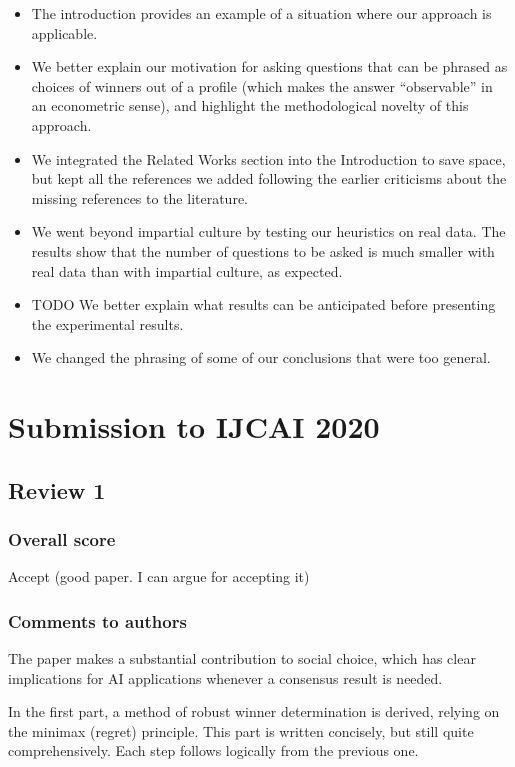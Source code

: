 \documentclass[version=3.21, pagesize, twoside=off, bibliography=totoc, DIV=calc, fontsize=12pt, a4paper]{scrartcl}
\begin{document}
\begin{itemize}
	\item The introduction provides an example of a situation where our approach is applicable.
	\item We better explain our motivation for asking questions that can be phrased as choices of winners out of a profile (which makes the answer “observable” in an econometric sense), and highlight the methodological novelty of this approach.
	\item We integrated the Related Works section into the Introduction to save space, but kept all the references we added following the earlier criticisms about the missing references to the literature.
	\item We went beyond impartial culture by testing our heuristics on real data. The results show that the number of questions to be asked is much smaller with real data than with impartial culture, as expected.
	\item TODO We better explain what results can be anticipated before presenting the experimental results.
	\item We changed the phrasing of some of our conclusions that were too general.
\end{itemize}

\section{Submission to IJCAI 2020}
\subsection{Review 1}
\subsubsection*{Overall score}
Accept (good paper. I can argue for accepting it)
\subsubsection*{Comments to authors}
The paper makes a substantial contribution to social choice, which has clear implications for AI applications whenever a consensus result is needed.

In the first part, a method of robust winner determination is derived, relying on the minimax (regret) principle. This part is written concisely, but still quite comprehensively. Each step follows logically from the previous one.
\end{document}
